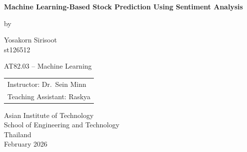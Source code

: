 \setcounter{page}{1}
\thispagestyle{empty}

\vspace*{\fill}

\begin{center}
        {\Large \bfseries Machine Learning-Based Stock Prediction Using Sentiment Analysis}

    \vspace{9em}

    by
    \begin{center}
        Yosakorn Sirisoot  \\[0.5em]
    {\small   st126512  }
    \end{center}

\vfill

    \begin{center} AT82.03 -- Machine Learning\end{center}

    \vspace{3em}
    
    \begin{tabular}{l}
        Instructor: Dr.\ Sein Minn \\
        Teaching Assistant: Raskya
    \end{tabular}

    \vspace{9em}

    Asian Institute of Technology\\
    School of Engineering and Technology\\
    Thailand\\
    February 2026
\end{center}




\vspace*{\fill}
